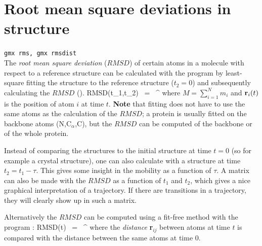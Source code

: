 
\section{Root mean square deviations in structure}
\label{sec:rmsd}
{\tt gmx rms, gmx rmsdist}\\
The {\em root mean square deviation} ($RMSD$) of certain atoms in a molecule
with respect to a reference structure can be calculated with the program 
{\tt {}} by least-square fitting the structure to the reference structure
($t_2 = 0$) and subsequently calculating the $RMSD$ ().
\beq
RMSD(t_1,t_2) ~=~ \left[\frac{1}{M} \sum_{i=1}^N m_i \|{\bf r}_i(t_1)-{\bf r}_i(t_2)\|^2 \right]^{}
\label{eqn:rmsd}
\eeq
where $M = \sum_{i=1}^N m_i$ and ${\bf r}_i(t)$ is the position of atom $i$ at time $t$.
{\bf Note} that fitting does not have to use the same atoms as the calculation
of the $RMSD$; {\eg} a protein is usually fitted on the backbone atoms
(N,C$_{\alpha}$,C), but the $RMSD$ can be computed of the backbone
or of the whole protein.

Instead of comparing the structures to the initial structure at time $t=0$ 
(so for example a crystal structure), one can also calculate  
with a structure at time $t_2=t_1-\tau$.
This gives some insight in the mobility as a function of $\tau$.
A matrix can also be made with the $RMSD$ as a function of $t_1$ and $t_2$,
which gives a nice graphical interpretation of a trajectory.
If there are transitions in a trajectory, they will clearly show up in
such a matrix.

Alternatively the $RMSD$ can be computed using a fit-free method with the 
program {\tt {}}:
\beq
RMSD(t) ~=~     \left[\frac{1}{N^2}\sum_{i=1}^N \sum_{j=1}^N    \|{\bf r}_{ij}(t)-{\bf r}_{ij}(0)\|^2\right]^{}
\label{eqn:rmsdff}
\eeq
where the {\em distance} {\bf r}$_{ij}$ between atoms at time $t$ 
is compared with the distance between the same atoms at time $0$.

